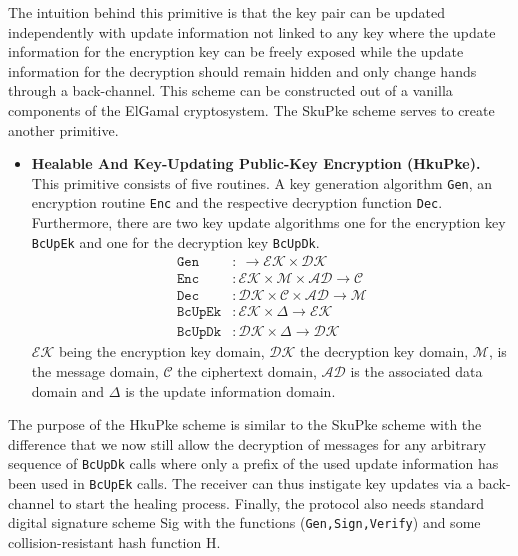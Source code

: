 \documentclass[11pt,a4paper,twoside,openright,bibliography=totoc]{scrbook}
\begin{document}
The intuition behind this primitive is that the key pair can be
updated independently with update information not linked to any
key where the update information for the encryption key can be freely
exposed while the update information for the decryption should
remain hidden and only change hands through a back-channel.
This scheme can be constructed out of a vanilla components
of the ElGamal cryptosystem. The SkuPke scheme serves to
create another primitive.
\begin{itemize}
\item \textbf{Healable And Key-Updating Public-Key Encryption (HkuPke).} This
  primitive consists of five routines. A key generation algorithm \texttt{Gen},
  an encryption routine \texttt{Enc} and the respective decryption function
  \texttt{Dec}. Furthermore, there are two key update algorithms one
  for the encryption key \texttt{BcUpEk} and one for the decryption key \texttt{BcUpDk}.
  \begin{align*}
    \texttt{Gen} & : \ \rightarrow \mathcal{EK} \times \mathcal{DK} \\
    \texttt{Enc} & : \mathcal{EK} \times \mathcal{M} \times \mathcal{AD}
                   \rightarrow \mathcal{C} \\
    \texttt{Dec} & : \mathcal{DK} \times \mathcal{C} \times \mathcal{AD}
                   \rightarrow \mathcal{M} \\
    \texttt{BcUpEk} & : \mathcal{EK} \times \Delta \rightarrow \mathcal{EK} \\
    \texttt{BcUpDk} & : \mathcal{DK} \times \Delta \rightarrow \mathcal{DK}
  \end{align*}
  $\mathcal{EK}$ being the encryption key domain, $\mathcal{DK}$ the decryption
  key domain, $\mathcal{M}$, is the message domain, $\mathcal{C}$ the ciphertext
  domain, $\mathcal{AD}$ is the associated data domain
  and $\Delta$ is the update information domain.
\end{itemize}

The purpose of the HkuPke scheme is similar to the SkuPke scheme with the difference
that we now still allow the decryption of messages for any arbitrary sequence
of \texttt{BcUpDk} calls where only a prefix of the used update information
has been used in \texttt{BcUpEk} calls. The receiver can thus
instigate key updates via a back-channel to start the healing process.
Finally, the protocol also needs standard digital signature scheme Sig
with the functions (\texttt{Gen,Sign,Verify}) and some collision-resistant
hash function H.
\end{document}

